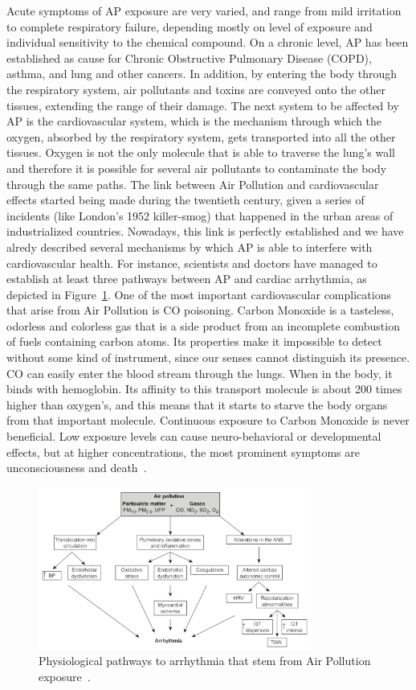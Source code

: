 Acute symptoms of \gls{AP} exposure are very varied, and range from mild
irritation to complete respiratory failure, depending mostly on level of
exposure and individual sensitivity to the chemical compound. On a
chronic level, \gls{AP} has been established as cause for Chronic
Obstructive Pulmonary Disease (\gls{COPD}), asthma, and lung and other
cancers. In addition, by entering the body through the respiratory
system, air pollutants and toxins are conveyed onto the other tissues,
extending the range of their damage. The next system to be affected by
\gls{AP} is the cardiovascular system, which is the mechanism through
which the oxygen, absorbed by the respiratory system, gets transported
into all the other tissues. Oxygen is not the only molecule
that is able to traverse the lung's wall and therefore it is possible
for several air pollutants to contaminate the body through the same
paths. The link between Air Pollution and cardiovascular effects started
being made during the twentieth century, given a series of incidents
(like London's 1952 killer-smog) that happened in the urban areas of
industrialized countries. Nowadays, this link is perfectly established
and we have alredy described several mechanisms by which \gls{AP} is
able to interfere with cardiovascular health. For instance, scientists
and doctors have managed to establish at least three pathways between
\gls{AP} and cardiac arrhythmia, as depicted in
Figure~\ref{fig:arrhythmia}. One of the most important cardiovascular
complications that arise from Air Pollution is CO poisoning. Carbon
Monoxide is a tasteless, odorless and colorless gas that is a side
product from an incomplete combustion of fuels containing carbon atoms.
Its properties make it impossible to detect without some kind of
instrument, since our senses cannot distinguish its presence. CO can
easily enter the blood stream through the lungs. When in the body, it
binds with hemoglobin. Its affinity to this transport molecule is about
200 times higher than oxygen's, and this means that it starts to starve
the body organs from that important molecule. Continuous exposure to
Carbon Monoxide is never beneficial. Low exposure levels can cause
neuro-behavioral or developmental effects, but at higher concentrations,
the most prominent symptoms are unconsciousness and
death~\cite{Penney}.

\begin{figure}[htpb]
    \centering
    \includegraphics[width=0.8\textwidth]{img/arrhythmia.png}
    \caption{Physiological pathways to arrhythmia that stem from Air
    Pollution exposure~\cite{Vallero2014}.}
    \label{fig:arrhythmia}
\end{figure}

